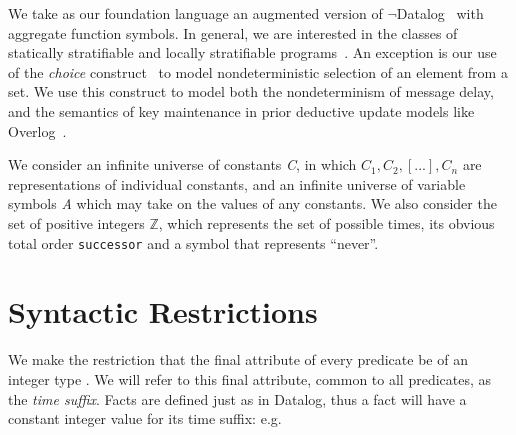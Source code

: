 \documentclass{acm_proc_article-sp-sigmod09}
\newcommand{\jmh}[1]{{\textcolor{red}{#1 -- jmh}}}
\newcommand{\wrm}[1]{{\color{BurntOrange}{#1 -- wrm}}}
\newcommand{\dedalus}[1]{\texttt{\fontsize{9pt}{9pt}\selectfont #1}}
\begin{document}
We take as our foundation language an augmented version of \linebreak
$\lnot$Datalog~\cite{ullmanbook} with aggregate function
symbols.  In general, we are interested in the classes of statically
stratifiable and locally stratifiable programs~\cite{prz}.  An exception is our
use of the \emph{choice} construct~\cite{greedychoice, eventchoice} to model
nondeterministic selection of an element from a set.  We use this construct to
model both the nondeterminism of message delay, and the semantics of key
maintenance in prior deductive update models like Overlog~\cite{boon}.

We consider an infinite universe of constants \emph{C}, in which
$C_{1}, C_{2}, [...], C_{n}$ are representations of individual constants, and
an infinite universe of variable symbols \emph{A} which may take on the values
of any constants.   We also consider the set of positive integers $\mathbb{Z}$,
which represents the set of possible times, its obvious total order
\dedalus{successor} and a symbol that represents ``never''.

\section{Syntactic Restrictions}



We make the restriction that the final attribute of every predicate be of an
integer type \wrm{we really want an inclusion constraint not just in the set of integers, but in the set of all possible times, in case time is finite}.  We will refer to this final attribute, common to all predicates,
as the \emph{time suffix}.  Facts are defined just as in Datalog, thus a fact
will have a constant integer value for its time suffix: e.g.
\end{document}
